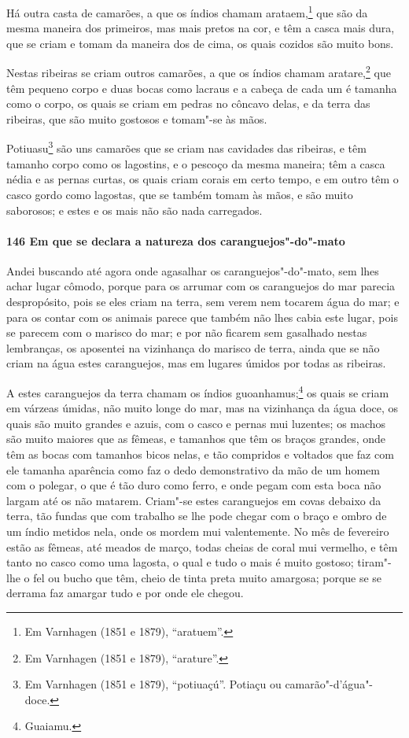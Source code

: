 \begin{linenumbers}
Há outra casta de camarões, a que os índios chamam arataem,\footnote{ Em Varnhagen (1851 e
1879), ``aratuem''.} que são da mesma maneira dos primeiros, mas mais pretos na cor, e
têm a casca mais dura, que se criam e tomam da maneira dos de cima, os quais cozidos são
muito bons.

Nestas ribeiras se criam outros camarões, a que os índios chamam aratare,\footnote{ Em
Varnhagen (1851 e 1879), ``arature''.} que têm pequeno corpo e duas bocas como lacraus e
a cabeça de cada um é tamanha como o corpo, os quais se criam em pedras no côncavo delas,
e da terra das ribeiras, que são muito gostosos e tomam"-se às mãos.

Potiuasu\footnote{ Em Varnhagen (1851 e 1879), ``potiuaçú''. Potiaçu ou
camarão"-d'água"-doce.} são uns camarões que se criam nas cavidades das ribeiras, e têm
tamanho corpo como os lagostins, e o pescoço da mesma maneira; têm a casca nédia e as
pernas curtas, os quais criam corais em certo tempo, e em outro têm o casco gordo como
lagostas, que se também tomam às mãos, e são muito saborosos; e estes e os mais não são
nada carregados.

\paragraph{146 Em que se declara a natureza dos caranguejos"-do"-mato}\quad
Andei buscando até agora onde agasalhar os caranguejos"-do"-mato, sem lhes achar lugar
cômodo, porque para os arrumar com os caranguejos do mar parecia despropósito, pois se
eles criam na terra, sem verem nem tocarem água do mar; e para os contar com os animais
parece que também não lhes cabia este lugar, pois se parecem com o marisco do mar; e por
não ficarem sem gasalhado nestas lembranças, os aposentei na vizinhança do marisco de
terra, ainda que se não criam na água estes caranguejos, mas em lugares úmidos por todas
as ribeiras.

A estes caranguejos da terra chamam os índios guoanhamus;\footnote{ Guaiamu.} os quais se
criam em várzeas úmidas, não muito longe do mar, mas na vizinhança da água doce, os quais
são muito grandes e azuis, com o casco e pernas mui luzentes; os machos são muito maiores
que as fêmeas, e tamanhos que têm os braços grandes, onde têm as bocas com tamanhos bicos
nelas, e tão compridos e voltados que faz com ele tamanha aparência como faz o dedo
demonstrativo da mão de um homem com o polegar, o que é tão duro como ferro, e onde pegam
com esta boca não largam até os não matarem. Criam"-se estes caranguejos em covas debaixo
da terra, tão fundas que com trabalho se lhe pode chegar com o braço e ombro de um índio
metidos nela, onde os mordem mui valentemente. No mês de fevereiro estão as fêmeas, até
meados de março, todas cheias de coral mui vermelho, e têm tanto no casco como uma
lagosta, o qual e tudo o mais é muito gostoso; tiram"-lhe o fel ou bucho que têm, cheio de
tinta preta muito amargosa; porque se se derrama faz amargar tudo e por onde ele chegou.


\end{linenumbers}

